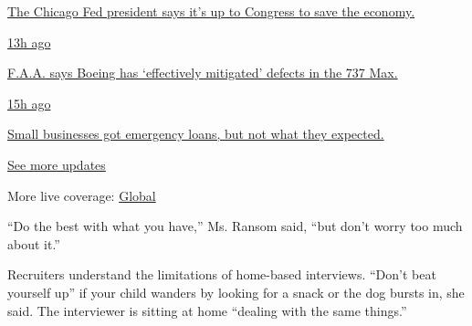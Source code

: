 \href{https://www.nytimes.com/live/2020/08/03/business/stock-market-today-coronavirus?action=click\&pgtype=Article\&state=default\&region=MAIN_CONTENT_1\&context=storylines_live_updates\#the-chicago-fed-president-says-its-up-to-congress-to-save-the-economy}{The
Chicago Fed president says it's up to Congress to save the economy.}

\href{https://www.nytimes.com/live/2020/08/03/business/stock-market-today-coronavirus?action=click\&pgtype=Article\&state=default\&region=MAIN_CONTENT_1\&context=storylines_live_updates\#faa-says-boeing-has-effectively-mitigated-defects-in-the-737-max}{13h
ago}

\href{https://www.nytimes.com/live/2020/08/03/business/stock-market-today-coronavirus?action=click\&pgtype=Article\&state=default\&region=MAIN_CONTENT_1\&context=storylines_live_updates\#faa-says-boeing-has-effectively-mitigated-defects-in-the-737-max}{F.A.A.
says Boeing has `effectively mitigated' defects in the 737 Max.}

\href{https://www.nytimes.com/live/2020/08/03/business/stock-market-today-coronavirus?action=click\&pgtype=Article\&state=default\&region=MAIN_CONTENT_1\&context=storylines_live_updates\#small-businesses-got-emergency-loans-but-not-what-they-expected}{15h
ago}

\href{https://www.nytimes.com/live/2020/08/03/business/stock-market-today-coronavirus?action=click\&pgtype=Article\&state=default\&region=MAIN_CONTENT_1\&context=storylines_live_updates\#small-businesses-got-emergency-loans-but-not-what-they-expected}{Small
businesses got emergency loans, but not what they expected.}

\href{https://www.nytimes.com/live/2020/08/03/business/stock-market-today-coronavirus?action=click\&pgtype=Article\&state=default\&region=MAIN_CONTENT_1\&context=storylines_live_updates}{See
more updates}

More live coverage:
\href{https://www.nytimes.com/2020/08/03/world/coronavirus-covid-19.html?action=click\&pgtype=Article\&state=default\&region=MAIN_CONTENT_1\&context=storylines_live_updates}{Global}

``Do the best with what you have,'' Ms. Ransom said, ``but don't worry
too much about it.''

Recruiters understand the limitations of home-based interviews. ``Don't
beat yourself up'' if your child wanders by looking for a snack or the
dog bursts in, she said. The interviewer is sitting at home ``dealing
with the same things.''

